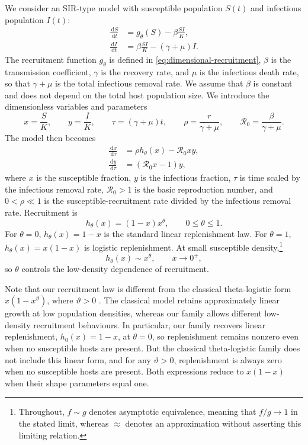 \documentclass[11pt]{article}
\newcommand{\Rzero}{\mathcal R_0}
\newcommand{\rhoeps}{\rho}
\newcommand{\hth}{h_\theta}
\newcommand{\dd}{\,\mathrm d}
\begin{document}
We consider an SIR-type model with susceptible population \(S(t)\) and infectious population \(I(t)\):
\begin{align}
\frac{\dd S}{\dd t} &= g_\theta(S)-\beta\frac{SI}{K},\label{eq:dimensional-models}\\
\frac{\dd I}{\dd t} &= \beta\frac{SI}{K}-(\gamma+\mu)I.\label{eq:dimensional-modeli}
\end{align}
The recruitment function \(g_\theta\) is defined in \cref{eq:dimensional-recruitment}, \(\beta\) is the transmission coefficient, \(\gamma\) is the recovery rate, and \(\mu\) is the infectious death rate, so that \(\gamma+\mu\) is the total infectious removal rate. We assume that \(\beta\) is constant and does not depend on the total host population size. We introduce the dimensionless variables and parameters
\[
x=\frac{S}{K},\qquad y=\frac{I}{K},\qquad
\tau=(\gamma+\mu)t,\qquad \rhoeps=\frac{r}{\gamma+\mu},\qquad
\Rzero=\frac{\beta}{\gamma+\mu}.
\]
The model then becomes
\begin{align}
\frac{\dd x}{\dd \tau} &= \rhoeps\hth(x)-\Rzero xy,\label{eq:modelx}\\
\frac{\dd y}{\dd \tau} &= (\Rzero x-1)y,\label{eq:modely}
\end{align}
where \(x\) is the susceptible fraction, \(y\) is the infectious fraction, \(\tau\) is time scaled by the infectious removal rate, \(\Rzero>1\) is the basic reproduction number, and \(0<\rhoeps\ll1\) is the susceptible-recruitment rate divided by the infectious removal rate. Recruitment is
\begin{equation}
\hth(x)=(1-x)x^\theta,\qquad 0\leq\theta\leq1.
\label{eq:hth}
\end{equation}
For \(\theta=0\), \(\hth(x)=1-x\) is the standard linear replenishment law. For \(\theta=1\), \(\hth(x)=x(1-x)\) is logistic replenishment. At small susceptible density,\footnote{Throughout, \(f\sim g\) denotes asymptotic equivalence, meaning that \(f/g\to1\) in the stated limit, whereas \(\approx\) denotes an approximation without asserting this limiting relation.}
\[
\hth(x)\sim x^\theta,\qquad x\to0^+,
\]
so \(\theta\) controls the low-density dependence of recruitment.

Note that our recruitment law is different from the classical theta-logistic form \(x(1-x^\vartheta)\), where \(\vartheta>0\) \cite{GilpinCaseAyala1976}. The classical model retains approximately linear growth at low population densities, whereas our family allows different low-density recruitment behaviours. In particular, our family recovers linear replenishment, \(h_0(x)=1-x\), at \(\theta=0\), so replenishment remains nonzero even when no susceptible hosts are present. But the classical theta-logistic family does not include this linear form, and for any \(\vartheta>0\), replenishment is always zero when no susceptible hosts are present. Both expressions reduce to \(x(1-x)\) when their shape parameters equal one.
\end{document}
